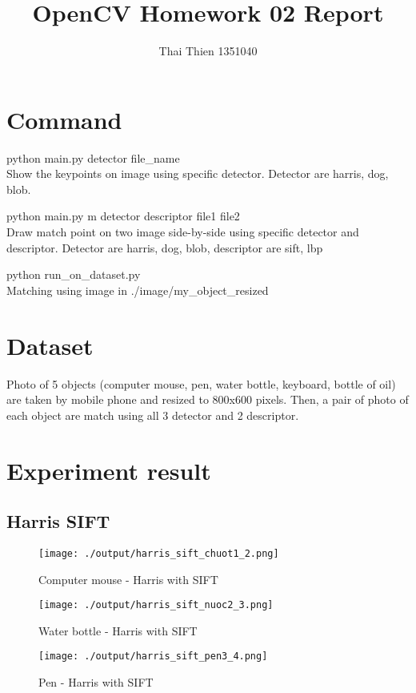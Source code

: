 \documentclass[a4paper, 12pt]{article}
\title{OpenCV Homework 02 Report}
\author{Thai Thien 1351040}
\begin{document}
\maketitle

\section{Command}
python main.py detector file\_name \\
Show the keypoints on image using specific detector. Detector are harris, dog, blob.

python main.py m detector descriptor file1 file2 \\
Draw match point on two image side-by-side using specific detector and descriptor.  Detector are harris, dog, blob, descriptor are sift, lbp

python run\_on\_dataset.py \\
Matching using image in ./image/my\_object\_resized 

\section{Dataset}
Photo of 5 objects (computer mouse, pen, water bottle, keyboard, bottle of oil) are taken by mobile phone and resized to 800x600 pixels. Then, a pair of photo of each object are match using all 3 detector and 2 descriptor.

\section{Experiment result}

\subsection{Harris SIFT}
\begin{figure}[H]
	\centering
	\texttt{[image: ./output/harris\_sift\_chuot1\_2.png]}
	\caption[]{Computer mouse - Harris with SIFT }
	\label{fig:harris_sift_chuot2_3.png}
\end{figure}
\begin{figure}[H]
	\centering
	\texttt{[image: ./output/harris\_sift\_nuoc2\_3.png]}
	\caption[]{Water bottle - Harris with SIFT }
	\label{fig:harris_sift_nuoc2_3.png}
\end{figure}

\begin{figure}[H]
	\centering
	\texttt{[image: ./output/harris\_sift\_pen3\_4.png]}
	\caption[]{Pen - Harris with SIFT }
\end{figure}
\end{document}
